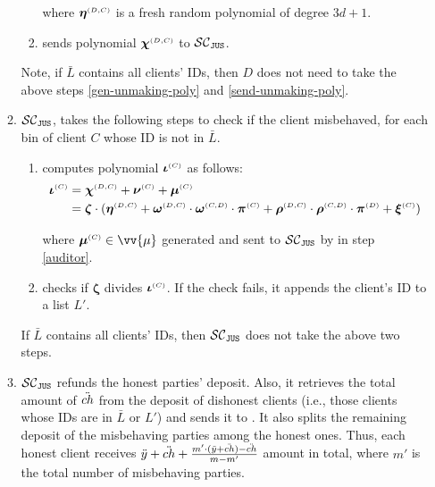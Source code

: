 \begin{enumerate}[leftmargin=4mm]
\begin{enumerate}[leftmargin=2mm]
\begin{enumerate}
 
  where $\bm\eta^{ \scriptscriptstyle {  {(D,C)}}}$ is a fresh random polynomial of degree $3d+1$. 
  
  \item\label{send-unmaking-poly} sends  polynomial $\bm\chi^{ \scriptscriptstyle {  {(D, C)}}}$ to  $\mathcal{SC}_{\mathtt{JUS}}$. 
  

 \end{enumerate}
  Note, if $\bar L$ contains all clients' IDs, then $D$ does not need to take the above steps \ref{gen-unmaking-poly} and \ref{send-unmaking-poly}. 
 
 \item  $\mathcal{SC}_{\mathtt{JUS}}$,   takes the following steps to check if the client misbehaved,  for each bin of client $    {  C}$ whose ID is not in $\bar L$.
 
 
  \begin{enumerate}
  
 \item computes  polynomial $\bm\iota^{\scriptscriptstyle  {  {(C)}}}$ as follows: 
  \begin{equation*}
\begin{split}
 \bm\iota^{ \scriptscriptstyle {  {(C)}}}&=\bm\chi^{\scriptscriptstyle  {  {(D, C)}}}+\bm\nu^{\scriptscriptstyle  {  {(C)}}} +\bm\mu^{ \scriptscriptstyle {  {(C)}}} \\ 
 &=\bm\zeta\cdot(\bm\eta^{ \scriptscriptstyle {  {(D,C)}}} + \bm\omega^{ \scriptscriptstyle {  {(D,C)}}}\cdot \bm\omega^{ \scriptscriptstyle {  {(C,D)}}}\cdot \bm\pi^{ \scriptscriptstyle {  {(C)}}}+\bm\rho^{ \scriptscriptstyle {  {(D,C)}}}\cdot \bm\rho^{ \scriptscriptstyle {  {(C,D)}}}\cdot \bm\pi^{ \scriptscriptstyle {  {(D)}}}+\bm\xi^{ \scriptscriptstyle {  {(C)}}})
 \end{split}
\end{equation*}

 where $\bm\mu^{ \st {  {(C)}}} \in \vv{\mu}$ generated and sent to $\mathcal{SC}_{\mathtt{JUS}}$  by \aud in step \ref{auditor}.   
  \item checks if $\bm\zeta$  divides $\bm\iota^{ \scriptscriptstyle {  {(C)}}}$. If the check fails, it appends the client's ID to  a list $ L'$.
  \end{enumerate}
   If $\bar L$ contains all clients' IDs, then $\mathcal{SC}_{\mathtt{JUS}}$ does not take the above two steps. 

   \item  $\mathcal{SC}_{\mathtt{JUS}}$  refunds the honest parties' deposit. Also, it retrieves the total amount of  $\ddot{ch}$ from the deposit of dishonest clients (i.e., those clients whose IDs are in $\bar L$ or $L'$) and sends it to \aud.  It also splits the remaining deposit of the misbehaving parties among the honest ones. Thus, each honest client  receives $\ddot{y}+\ddot{ch}+\frac{m'\cdot (\ddot{y}+\ddot{ch})-\ddot{ch}}{m-m'}$ amount in total, where $m'$ is the total number of misbehaving parties.
 

\end{enumerate}
\end{enumerate}
